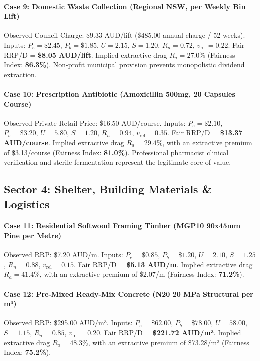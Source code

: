 \documentclass[preprint,12pt,authoryear]{elsarticle}
\begin{document}
\paragraph{Case 9: Domestic Waste Collection (Regional NSW, per Weekly Bin Lift)}
Observed Council Charge: \$9.33 AUD/lift (\$485.00 annual charge / 52 weeks). Inputs: $P_e = \$2.45$, $P_b = \$1.85$, $U = 2.15$, $S = 1.20$, $R_n = 0.72$, $v_{\text{rel}} = 0.22$. Fair RRP/D = \textbf{\$8.05 AUD/lift}. Implied extractive drag $R_a = \mathbf{27.0\%}$ (Fairness Index: \textbf{86.3\%}). Non-profit municipal provision prevents monopolistic dividend extraction.

\paragraph{Case 10: Prescription Antibiotic (Amoxicillin 500mg, 20 Capsules Course)}
Observed Private Retail Price: \$16.50 AUD/course. Inputs: $P_e = \$2.10$, $P_b = \$3.20$, $U = 5.80$, $S = 1.20$, $R_n = 0.94$, $v_{\text{rel}} = 0.35$. Fair RRP/D = \textbf{\$13.37 AUD/course}. Implied extractive drag $R_a = \mathbf{29.4\%}$, with an extractive premium of \$3.13/course (Fairness Index: \textbf{81.0\%}). Professional pharmacist clinical verification and sterile fermentation represent the legitimate core of value.

\subsection{Sector 4: Shelter, Building Materials \& Logistics}
\paragraph{Case 11: Residential Softwood Framing Timber (MGP10 90x45mm Pine per Metre)}
Observed RRP: \$7.20 AUD/m. Inputs: $P_e = \$0.85$, $P_b = \$1.20$, $U = 2.10$, $S = 1.25$, $R_n = 0.88$, $v_{\text{rel}} = 0.15$. Fair RRP/D = \textbf{\$5.13 AUD/m}. Implied extractive drag $R_a = \mathbf{41.4\%}$, with an extractive premium of \$2.07/m (Fairness Index: \textbf{71.2\%}).

\paragraph{Case 12: Pre-Mixed Ready-Mix Concrete (N20 20 MPa Structural per m³)}
Observed RRP: \$295.00 AUD/m³. Inputs: $P_e = \$62.00$, $P_b = \$78.00$, $U = 58.00$, $S = 1.15$, $R_n = 0.85$, $v_{\text{rel}} = 0.20$. Fair RRP/D = \textbf{\$221.72 AUD/m³}. Implied extractive drag $R_a = \mathbf{48.3\%}$, with an extractive premium of \$73.28/m³ (Fairness Index: \textbf{75.2\%}).
\end{document}
